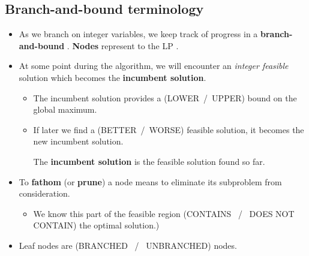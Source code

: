 \documentclass[11pt]{article}
\theoremstyle{definition}
\newcommand{\answerbox}[3]{%
  \fbox{%
    \begin{minipage}[#1]{#2}
      \hfill\vspace{#3}
    \end{minipage}
  }
}
\newcommand{\wordbox}{\answerbox{c}{1.2in}{.7cm}}
\newcommand{\catbox}{\answerbox{c}{.5in}{.7cm}}
\begin{document}
\subsection{Branch-and-bound terminology}
\begin{itemize}
\item As we branch on integer variables, we keep track of progress in a \textbf{branch-and-bound} \catbox.  \textbf{Nodes} represent \wordbox to the LP \wordbox.
\item At some point during the algorithm, we will encounter an \emph{integer feasible} solution which becomes the \textbf{incumbent solution}. 
	\begin{itemize}
		\item The incumbent solution provides a (LOWER~/~UPPER) bound on the global maximum.
		\item If later we find a (BETTER~/~WORSE) feasible solution, it becomes the new incumbent solution.
		\begin{tcolorbox} The \textbf{incumbent solution} is the \catbox feasible solution found so far. \end{tcolorbox}
	\end{itemize}
\item To \textbf{fathom} (or \textbf{prune}) a node means to eliminate its subproblem from consideration.  
\begin{itemize}
	\item We know this part of the feasible region (CONTAINS ~/~ DOES NOT CONTAIN) the optimal solution.)  
\end{itemize}
\item Leaf nodes are (BRANCHED ~/~ UNBRANCHED) nodes.  


\end{itemize}
\end{document}
